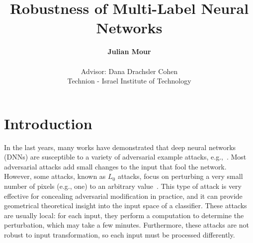 \documentclass[11pt]{article}
\newcommand{\Dana}[1]{\textcolor{purple}{\bf Dana: #1}}
\begin{document}
\title{Robustness of Multi-Label Neural Networks}

\author{
    \textbf{Julian Mour} \\
    \\
    Advisor: Dana Drachsler Cohen\\
    Technion - Israel Institute of Technology
}

\maketitle

\section{Introduction}

In the last years, many works have demonstrated that deep neural networks (DNNs) are susceptible to a variety of adversarial example attacks, e.g.,~\cite{ref7,ref15,szegedy2014intriguing,ref17,ref29,ref56}. Most adversarial attacks add small changes to the input that fool the network. However, some attacks, known as $L_0$ attacks, focus on perturbing a very small number of pixels (e.g., one) to an arbitrary value~\cite{OnePixelAttack, alatalo2021chromatic, vargas2019understanding}. This type of attack is very effective for concealing adversarial modification in practice, and it can provide geometrical theoretical insight into the input space of a classifier. %
These attacks are usually local: for each input, they perform a computation to determine the perturbation, which may take a few minutes. Furthermore, these attacks are not robust to input transformation, so each input must be processed differently.
\end{document}
